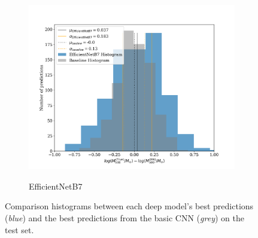 \begin{figure}[H]
\begin{subfigure}{.325\textwidth}
    \includegraphics[width=\linewidth]{images/Chapter4/Results/test_EfficientNetB7_hist.png}
    \label{fig:test_EfficientNetB7_hist}
    \caption{EfficientNetB7}
\end{subfigure}
\caption{Comparison histograms between each deep model's best predictions (\textit{blue}) and the best predictions from the basic CNN (\textit{grey}) on the test set.}
\end{figure}





